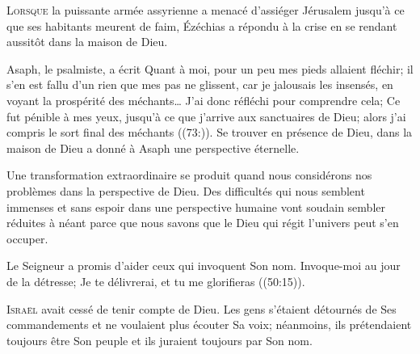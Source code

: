 \lettrine{L}{orsque} la puissante armée assyrienne a menacé d'assiéger
 Jérusalem jusqu'à ce que ses habitants meurent de faim,
 Ézéchias a répondu à la crise en se rendant aussitôt
 dans la maison de Dieu. 


Asaph, le psalmiste, a écrit\frcolon{} 
 \Og Quant à moi, pour un peu mes pieds allaient fléchir;
 il s’en est fallu d’un rien que mes pas ne glissent,
 car je jalousais les insensés, en voyant la prospérité des méchants\dots{}
 J’ai donc réfléchi pour comprendre cela; Ce fut pénible à mes yeux,
 jusqu’à ce que j’arrive aux sanctuaires de Dieu;
 alors j’ai compris le sort final des méchants \Fg{} ((73:)).
 Se trouver en présence de Dieu, dans la maison de Dieu
 a donné à Asaph une perspective éternelle. 

Une transformation extraordinaire se produit quand nous considérons
 nos problèmes dans la perspective de Dieu.
 Des difficultés qui nous semblent immenses et sans espoir
 dans une perspective humaine vont soudain sembler réduites à néant
 \ocadr parce que nous savons que le Dieu qui régit l'univers
 peut s'en occuper. 

Le Seigneur a promis d'aider ceux qui invoquent Son nom.
 \Og Invoque-moi au jour de la détresse; Je te délivrerai,
 et tu me glorifieras \Fg{} ((50:15)).

\dvrule







\lettrine{I}{sraël} avait cessé de tenir compte de Dieu.
 Les gens s'étaient détournés de Ses commandements
 et ne voulaient plus écouter Sa voix; néanmoins, 
 ils prétendaient toujours être Son peuple
 et ils juraient toujours par Son nom. 

